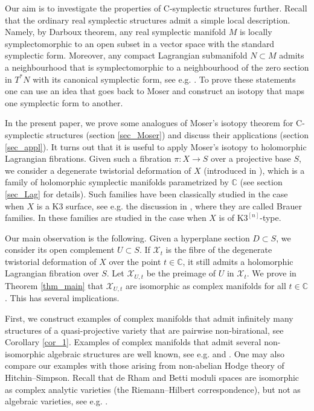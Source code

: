 \documentclass[10pt]{amsart}
\newcommand{\bbC}{\mathbb{C}}
\newcommand{\XX}{\mathcal{X}}
\begin{document}
Our aim is to investigate the properties
of C-symplectic structures further. Recall that the ordinary real symplectic
structures admit a simple local description. Namely, by
Darboux theorem, any real symplectic 
manifold $M$ is locally symplectomorphic to an open subset in a vector
space with the standard symplectic form. Moreover, any compact Lagrangian
submanifold $N\subset M$ admits a neighbourhood that is symplectomorphic
to a neighbourhood of the zero section in $T^*N$ with its canonical symplectic
form, see e.g. \cite[section 3]{MS}. To prove 
these statements one can use an idea that
goes back to Moser \cite{Mo} and construct an isotopy that maps
one symplectic form to another.

In the present paper, we prove some analogues of Moser's isotopy theorem
for C-symplectic structures (section \ref{sec_Moser})
and discuss their applications (section \ref{sec_appl}). It turns
out that it is useful to apply Moser's isotopy to holomorphic Lagrangian
fibrations. Given such a fibration $\pi\colon X\to S$ over a projective base $S$, we consider a degenerate
twistorial deformation of $X$ (introduced in \cite{V2}), 
which is a family of holomorphic symplectic
manifolds parametrized by $\bbC$ (see section \ref{sec_Lag} for details).
Such families have been classically studied in the case when $X$ is a K3
surface, see e.g. the discussion in \cite{Hu2}, where they are called
Brauer families. In \cite{Mar} these families
are studied in the case when $X$ is of $\mbox{K3}^{[n]}$-type. 

Our main observation is the following.
Given a hyperplane section $D\subset S$, we consider its open complement $U\subset S$.
If $\XX_t$ is the fibre of the degenerate twistorial deformation of $X$
over the point $t\in\bbC$,
it still admits a holomorphic Lagrangian fibration over $S$. Let $\XX_{U,t}$
be the preimage of $U$ in $\XX_t$. We prove in Theorem \ref{thm_main} that $\XX_{U,t}$
are isomorphic as complex manifolds for all $t\in \bbC$.
This has several implications.

First, we construct examples of complex
manifolds that admit infinitely many structures of a quasi-projective variety
that are pairwise non-birational, see Corollary \ref{cor_1}. Examples of complex
manifolds that admit several non-isomorphic algebraic structures are well known,
see e.g. \cite[Chapter VI, \S 3]{Ha} and \cite{Je}.
One may also compare our examples with those arising from non-abelian
Hodge theory of Hitchin--Simpson. Recall that de Rham and Betti moduli spaces
are isomorphic as complex analytic varieties (the Riemann--Hilbert
correspondence), but not as algebraic varieties, see e.g. \cite[Proposition 9]{Si}.
\end{document}
